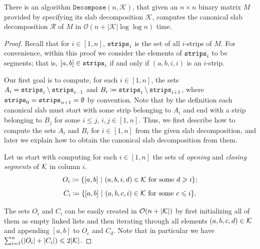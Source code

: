 \documentclass[runningheads]{llncs}
\newcommand{\Oh}{\mathcal{O}}
\renewcommand{\leq}{\leqslant}
\renewcommand{\geq}{\geqslant}
\begin{document}
\begin{theorem}\label{thm:canonical}
There is an algorithm $\mathtt{Decompose}(n,\mathcal{K})$, that
given
an $n \times n$ binary matrix $M$ provided by specifying its slab decomposition
$\mathcal{K}$, computes the canonical slab decomposition $\mathcal{R}$ of
$M$ in $\Oh(n+|\mathcal{K}|\log \log n)$ time.
\end{theorem}
\begin{proof}
	Recall that for $i\in [1,n]$, $\mathtt{strips}_i$ is the set of all $i$-strips of $M$. For convenience, within this proof we consider the elements of $\mathtt{strips}_i$ to be segments; that is, $[a,b]\in \mathtt{strips}_i$ if and only if $(a,b,i,i)$ is an $i$-strip.
	
	Our first goal is to compute, for each $i\in [1,n]$, the sets
	$A_i=\mathtt{strips}_i\setminus \mathtt{strips}_{i-1}$ and $B_i\coloneqq \mathtt{strips}_i\setminus \mathtt{strips}_{i+1}$,
	where $\mathtt{strips}_0 = \mathtt{strips}_{n+1}=\emptyset$ by convention. 
	Note that by the definition each canonical slab must start with some strip belonging to $A_i$ and end with a strip belonging to $B_j$ for some $i\leq j$, $i,j\in [1,n]$. 
	Thus, we first describe how to compute the sets $A_i$ and $B_i$ for $i \in [1, n]$ from the given slab decomposition, and later we explain how to obtain the canonical slab decomposition from them.
	
	Let us start with computing for each $i\in [1,n]$ the sets of {\em{opening}} and {\em{closing segments}} of $\cal K$ in column $i$. 
	\[O_i\coloneqq \{[a,b]~|~(a,b,i,d)\in {\cal K} \textrm{ for some $d\geq i$}\};\] \[C_i\coloneqq \{[a,b]~|~(a,b,c,i)\in {\cal K} \textrm{ for some $c\leq i$}\}.\]
	
	The sets $O_i$ and $C_i$ can be easily created in $\Oh(n + |\cal K|)$ by first initializing all of them as empty linked lists and then iterating through all elements $(a, b, c, d) \in \cal K$ and appending $[a, b]$ to $O_c$ and $C_d$. Note that in particular we have $\sum_{i=1}^n (|O_i|+|C_i|)\leq 2|\cal K|$.
	

\end{proof}
\end{document}
